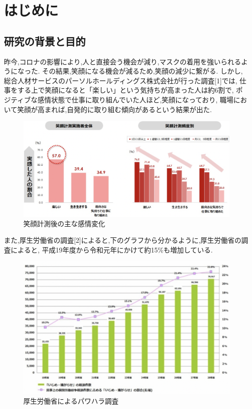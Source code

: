 \chapter{はじめに}
\label {chp:tex_basic}

\section{研究の背景と目的}
\label{sec:tex_basic_section}
昨今,コロナの影響により,人と直接会う機会が減り,マスクの着用を強いられるようになった.
その結果,笑顔になる機会が減るため,笑顔の減少に繋がる.
しかし,総合人材サービスのパーソルホールディングス株式会社が行った調査[1]では,
仕事をする上で笑顔になると「楽しい」という気持ちが高まった人は約6割で,
ポジティブな感情状態で仕事に取り組んでいた人ほど,笑顔になっており,
職場において笑顔が高まれば,自発的に取り組む傾向があるという結果が出た.

\begin{figure}[!h]
    \begin{center}
        \includegraphics[scale=0.5, clip]{./img/work.png}
        \caption{笑顔計測後の主な感情変化}
        \label{fig:図の名前}
    \end{center}
\end{figure}

また,厚生労働省の調査[2]によると,下のグラフから分かるように,厚生労働省の調査によると,
平成19年度から令和元年にかけて約15\%も増加している.

\begin{figure}[!h]
    \begin{center}
        \includegraphics[scale=0.6, clip]{./img/graph.png}
        \caption{厚生労働省によるパワハラ調査}
        \label{fig:図の名前}
    \end{center}
\end{figure}

